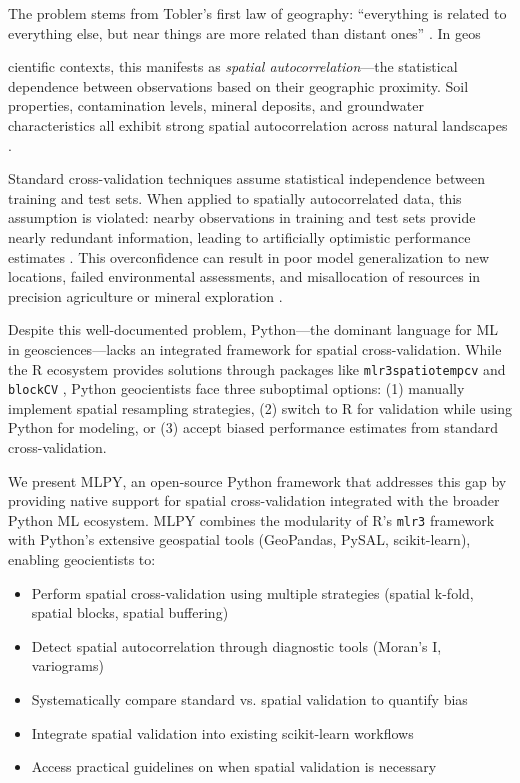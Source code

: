 \documentclass[review,12pt]{elsarticle}
\begin{document}
The problem stems from Tobler's first law of geography: ``everything is related to everything else, but near things are more related than distant ones'' \citep{tobler1970computer}. In geos

cientific contexts, this manifests as \textit{spatial autocorrelation}---the statistical dependence between observations based on their geographic proximity. Soil properties, contamination levels, mineral deposits, and groundwater characteristics all exhibit strong spatial autocorrelation across natural landscapes \citep{goovaerts1997geostatistics, webster2007geostatistics}.

Standard cross-validation techniques assume statistical independence between training and test sets. When applied to spatially autocorrelated data, this assumption is violated: nearby observations in training and test sets provide nearly redundant information, leading to artificially optimistic performance estimates \citep{roberts2017cross, meyer2018improving}. This overconfidence can result in poor model generalization to new locations, failed environmental assessments, and misallocation of resources in precision agriculture or mineral exploration \citep{ploton2020spatial}.

Despite this well-documented problem, Python---the dominant language for ML in geosciences---lacks an integrated framework for spatial cross-validation. While the R ecosystem provides solutions through packages like \texttt{mlr3spatiotempcv} \citep{schratz2019hyperparameter} and \texttt{blockCV} \citep{valavi2019blockcv}, Python geocientists face three suboptimal options: (1) manually implement spatial resampling strategies, (2) switch to R for validation while using Python for modeling, or (3) accept biased performance estimates from standard cross-validation.

We present MLPY, an open-source Python framework that addresses this gap by providing native support for spatial cross-validation integrated with the broader Python ML ecosystem. MLPY combines the modularity of R's \texttt{mlr3} framework \citep{lang2019mlr3} with Python's extensive geospatial tools (GeoPandas, PySAL, scikit-learn), enabling geocientists to:

\begin{itemize}
\item Perform spatial cross-validation using multiple strategies (spatial k-fold, spatial blocks, spatial buffering)
\item Detect spatial autocorrelation through diagnostic tools (Moran's I, variograms)
\item Systematically compare standard vs. spatial validation to quantify bias
\item Integrate spatial validation into existing scikit-learn workflows
\item Access practical guidelines on when spatial validation is necessary
\end{itemize}
\end{document}
